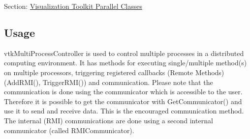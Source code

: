 Section\-: \hyperlink{sec_vtkparallel}{Visualization Toolkit Parallel Classes} \hypertarget{vtkwidgets_vtkxyplotwidget_Usage}{}\subsection{Usage}\label{vtkwidgets_vtkxyplotwidget_Usage}
vtk\-Multi\-Process\-Controller is used to control multiple processes in a distributed computing environment. It has methods for executing single/multiple method(s) on multiple processors, triggering registered callbacks (Remote Methods) (Add\-R\-M\-I(), Trigger\-R\-M\-I()) and communication. Please note that the communication is done using the communicator which is accessible to the user. Therefore it is possible to get the communicator with Get\-Communicator() and use it to send and receive data. This is the encouraged communication method. The internal (R\-M\-I) communications are done using a second internal communicator (called R\-M\-I\-Communicator).

